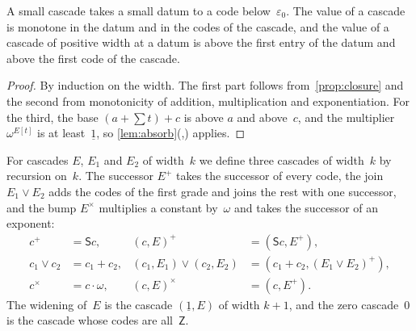 \documentclass[11pt]{amsart}
\makeatletter
\newcommand{\bZ}{\mathsf{Z}}
\newcommand{\bS}{\mathsf{S}}
\newcommand{\bplus}{\mathbin{+}}
\newcommand{\btimes}{\mathbin{\cdot}}
\newcommand{\num}[1]{\underline{#1}}          %
\newcommand{\eps}{\varepsilon_{0}}
\newcommand{\tsum}[1]{\textstyle\sum #1}
\newcommand{\act}[2]{#1[#2]}                  %
\newif\ifagdarefs
\newcommand{\AgdaRefs}[1]{\ifagdarefs{\footnotesize\color{agdablue}(#1)}\else\unskip\fi}
\newcommand{\Agda}[2]{{\footnotesize\color{agdablue}\textsf{#1}%
  \ifblank{#2}{}{\texttt{.}\allowbreak\texttt{#2}}}}
\let\ttt@plain\texttt
\renewcommand{\texttt}[1]{{\footnotesize\color{agdablue}\ttt@plain{#1}}}
\theoremstyle{plain}
\theoremstyle{definition}
\makeatother
\begin{document}
\begin{lemma}
\label{lem:cascade-basic}
A small cascade takes a small datum to a code below~$\eps$. The value
of a cascade is monotone in the datum and in the codes of the
cascade, and the value of a cascade of positive width at a datum is
above the first entry of the datum and above the first code of the
cascade.
\AgdaRefs{\Agda{BrouwerOrdinals.Cascade}{valSc-<-ε₀};
\texttt{valSc-mono}, \texttt{valSc-increasing}, \texttt{valSc-const};
\Agda{BrouwerOrdinals.CascadeLevel}{valSc-⊑}.}
\end{lemma}

\begin{proof}
By induction on the width. The first part follows
from~\cref{prop:closure} and the second from monotonicity of addition,
multiplication and exponentiation. For the third, the base
$(a \bplus \tsum t) \bplus c$ is above $a$ and above~$c$, and the
multiplier $\omega^{\act E t}$ is at least~$\num 1$, so
\cref{lem:absorb}(,)
applies.
\end{proof}

\begin{definition}
\label{def:cascade-ops}
For cascades $E$, $E_1$ and $E_2$ of width~$k$ we define three
cascades of width~$k$ by recursion on~$k$. The successor $E^{+}$
takes the successor of every code, the join $E_1 \vee E_2$ adds the
codes of the first grade and joins the rest with one successor, and
the bump $E^{\times}$ multiplies a constant by~$\omega$ and takes the
successor of an exponent:
\begin{align*}
  c^{+} &= \bS c , &
  (c, E)^{+} &= (\bS c, E^{+}) , \\
  c_1 \vee c_2 &= c_1 \bplus c_2 , &
  (c_1, E_1) \vee (c_2, E_2)
    &= (c_1 \bplus c_2, (E_1 \vee E_2)^{+}) , \\
  c^{\times} &= c \btimes \omega , &
  (c, E)^{\times} &= (c, E^{+}) .
\end{align*}
The widening of~$E$ is the cascade $(\num 1, E)$ of width $k+1$, and
the zero cascade~$0$ is the cascade whose codes are all~$\bZ$.
\AgdaRefs{\Agda{BrouwerOrdinals.Cascade}{sucSc}; \texttt{joinSc},
\texttt{bumpSc}, \texttt{upSc}, \texttt{zeroSc}.}
\end{definition}
\end{document}
